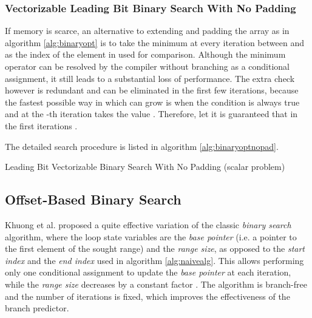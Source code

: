 \documentclass[preprint,1p,times]{elsarticle}
\begin{document}
\subsubsection{Vectorizable Leading Bit Binary Search With No Padding}
If memory is scarce, an alternative to extending and padding the array  as in algorithm \ref{alg:binaryopt} is to take the minimum at every iteration between  and  as the index of the element in  used for comparison.
Although the minimum operator can be resolved by the compiler without branching as a conditional assignment, it still leads to a substantial loss of performance. The extra check however is redundant and can be eliminated in the first few iterations, because the fastest possible way in which  can grow is when the condition  is always true and at the -th iteration  takes the value . Therefore, let  it is guaranteed that in the first  iterations .

The detailed search procedure is listed in algorithm \ref{alg:binaryoptnopad}.

\begin{algorithm}[ht]
\caption{Leading Bit Vectorizable Binary Search With No Padding (scalar problem)}
\label{alg:binaryoptnopad}
\begin{algorithmic}
\Function {\BitSetNoPadName}{\fin ,  , , , \fout }
\State 
\State 

\Repeat
       \State  {}
	\If {}   
        	\State 
	\EndIf
	\State   {}
   \State 
\Until{}

\While{}
    	\State  {}
    	\State   {}
    	\If {}
        	\State     {}
    	\EndIf
	\State  {}
\EndWhile
\EndFunction
\end{algorithmic}
\end{algorithm}

\subsection{Offset-Based Binary Search}
\label{sec:offset}
Khuong et al. \cite{Morin2015} proposed a quite effective variation of the classic \textit{binary search} algorithm, where the loop state variables are the \textit{base pointer} (i.e. a pointer to the first element of the sought range) and the \textit{range size}, as opposed to the \textit{start index} and the \textit{end index} used in algorithm \ref{alg:naivealg}. This allows performing only one conditional assignment to update the \textit{base pointer} at each iteration, while the \textit{range size} decreases by a constant factor . The algorithm is branch-free and the number of iterations is fixed, which improves the effectiveness of the branch predictor.
\end{document}
